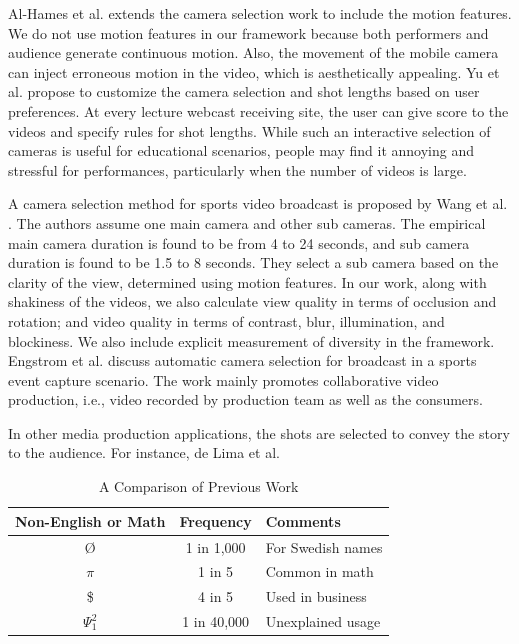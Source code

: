 \documentclass{sig-alternate}
\begin{document}
Al-Hames et al. \cite{saini2012movimash} extends the camera selection work to include
the motion features. We do not use motion features in our framework
because both performers and audience generate continuous
motion. Also, the movement of the mobile camera can inject erroneous
motion in the video, which is aesthetically appealing. Yu et
al. \cite{saini2012movimash} propose to customize the camera selection and shot lengths
based on user preferences. At every lecture webcast receiving site,
the user can give score to the videos and specify rules for shot
lengths. While such an interactive selection of cameras is useful
for educational scenarios, people may find it annoying and stressful
for performances, particularly when the number of videos is
large.

A camera selection method for sports video broadcast is proposed
by Wang et al. \cite{saini2012movimash}. The authors assume one main camera
and other sub cameras. The empirical main camera duration is
found to be from 4 to 24 seconds, and sub camera duration is found
to be 1.5 to 8 seconds. They select a sub camera based on the clarity
of the view, determined using motion features. In our work,
along with shakiness of the videos, we also calculate view quality
in terms of occlusion and rotation; and video quality in terms
of contrast, blur, illumination, and blockiness. We also include
explicit measurement of diversity in the framework. Engstrom et
al. \cite{saini2012movimash} discuss automatic camera selection for broadcast in a sports
event capture scenario. The work mainly promotes collaborative
video production, i.e., video recorded by production team as well
as the consumers.

In other media production applications, the shots are selected to
convey the story to the audience. For instance, de Lima et al. \cite{saini2012movimash}

\begin{table}[h!]
\centering
\caption{A Comparison of Previous Work}
\begin{tabular}{|c|c|l|} \hline
Non-English or Math&Frequency&Comments\\ \hline
\O & 1 in 1,000& For Swedish names\\ \hline
$\pi$ & 1 in 5& Common in math\\ \hline
\$ & 4 in 5 & Used in business\\ \hline
$\Psi^2_1$ & 1 in 40,000& Unexplained usage\\
\hline\end{tabular}
\end{table}
\end{document}
